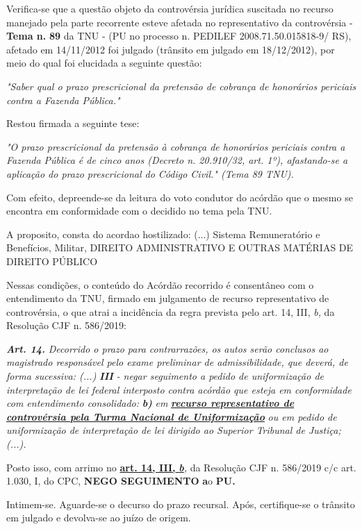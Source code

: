 \documentclass[12pt]{article}
\begin{document}
\justifying
\noindent Verifica-se que a questão objeto da controvérsia jurídica suscitada no recurso manejado pela parte recorrente esteve afetada no representativo da controvérsia - \textbf{Tema n. }\textbf{89} da TNU - (PU no processo n. PEDILEF 2008.71.50.015818-9/ RS),  afetado em 14/11/2012 foi julgado (trânsito em julgado em 18/12/2012), por meio do qual foi elucidada a seguinte questão:

\noindent \textit{"Saber qual o prazo prescricional da pretensão de cobrança de honorários periciais contra a Fazenda Pública."}

\noindent Restou firmada a seguinte tese:

\noindent \textit{"O prazo prescricional da pretensão à cobrança de honorários periciais contra a Fazenda Pública é de cinco anos (Decreto n. 20.910/32, art. 1º), afastando-se a aplicação do prazo prescricional do Código Civil." (Tema 89 TNU).}

\noindent Com efeito, depreende-se da leitura do voto condutor do acórdão que o mesmo se encontra em conformidade com o decidido no  tema pela TNU.

\noindent A proposito, consta do acordao hostilizado: (...) Sistema Remuneratório e Benefícios, Militar, DIREITO ADMINISTRATIVO E OUTRAS MATÉRIAS DE DIREITO PÚBLICO

\noindent Nessas condições, o conteúdo do Acórdão recorrido é consentâneo com o entendimento da TNU, firmado em julgamento de recurso representativo de controvérsia, o que atrai a incidência da regra prevista pelo art. 14, III, \textit{b,} da Resolução CJF n. 586/2019:

\noindent \textit{\textbf{Art. 14.}}\textit{ Decorrido o prazo para contrarrazões, os autos serão conclusos ao magistrado responsável pelo exame preliminar de admissibilidade, que deverá, de forma sucessiva: (...) }\textit{\textbf{III }}\textit{- negar seguimento a pedido de uniformização de interpretação de lei federal interposto contra acórdão que esteja em conformidade com entendimento consolidado: }\textit{\textbf{b)}}\textit{ em }\uline{\textit{\textbf{recurso representativo de controvérsia pela Turma Nacional de Uniformização}}}\textit{ ou em pedido de uniformização de interpretação de lei dirigido ao Superior Tribunal de Justiça;(...).}

\noindent Posto isso, com arrimo no \uline{\textbf{art. 14, III, }}\uline{\textit{\textbf{b}}}\textit{,} da Resolução CJF n. 586/2019 c/c art. 1.030, I, do CPC, \textbf{NEGO SEGUIMENTO }\textbf{a}o\textbf{ PU}\textbf{.}

\noindent Intimem-se. Aguarde-se o decurso do prazo recursal. Após, certifique-se o trânsito em julgado e devolva-se ao juízo de origem.
\end{document}
